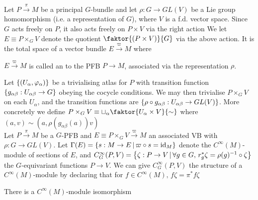 \documentclass{article}
\begin{document}
Let $P\overset{\pi}{\to}M$ be a principal $G$-bundle and let $\rho: G \to GL(V)$ be a Lie group homomorphism (i.e. a representation of $G$), where $V$ is a f.d. vector space. Since $G$ acts freely on $P$, it also acts freely on $P\times V$ via the right action 
We let $E \equiv P \times_G V$ denote the quotient $\faktor{(P\times V)}{G}$ via the above action. It is the total space of a vector bundle $E\overset{\varpi}{\to}M$ where 
\begin{definition}
	$E\overset{\varpi}{\to}M$ is called an  to the PFB $P \to M$, associated via the representation $\rho$. 
\end{definition}
Let $\left\{ (U_\alpha,\varphi_\alpha) \right\}$ be a trivialising atlas for $P$ with transition function $\left\{ g_{\alpha\beta}:U_{\alpha\beta} \to G \right\}$ obeying the cocycle conditions. We may then trivialise $P\times_G V$ on each $U_\alpha$, and the transition functions are $\left\{ \rho \circ g_{\alpha\beta}:U_{\alpha\beta}\to GL(V) \right\}$. More concretely we define $P \times_G V \equiv \sqcup_\alpha \faktor{U_\alpha \times V}{\sim}$ where $(a,v) \sim (a,\rho(g_{\alpha\beta}(a))v)$ \\
Let $P\overset{\pi}{\to} M$ be a $G$-PFB and $E\equiv P \times_G V \overset{\varpi}{\to} M$ an associated VB with $\rho: G \to GL(V)$. Let $\Gamma(E) = \left\{ s:M \to E \, | \, \varpi \circ s = \operatorname{id}_M \right\}$ denote the $C^\infty(M)$-module of sections of $E$, and $C^\infty_G(P,V) = \left\{ \zeta : P \to V \, | \, \forall g \in G, \, r_g^\ast \zeta = \rho(g)^{-1} \circ \zeta  \right\}$ the $G$-equivariant functions $P \to V$. We can give $C^\infty_G(P,V)$ the structure of a $C^\infty(M)$-module by declaring that for $f \in C^\infty(M), \, f \zeta = \pi^\ast f \zeta$ 
\begin{prop}
	There is a $C^\infty(M)$-module isomorphism 
\end{prop}
\end{document}

